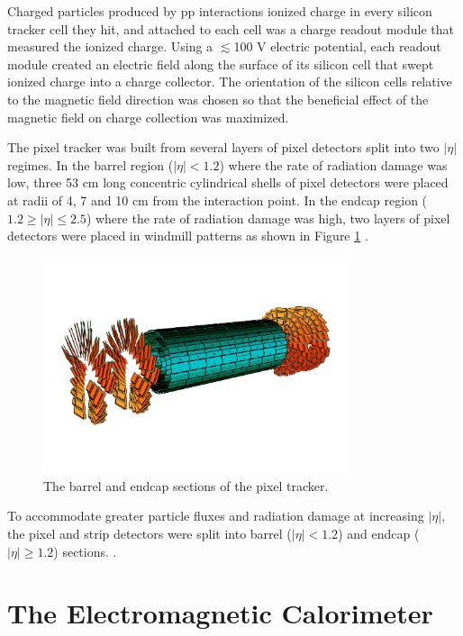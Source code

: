 Charged particles produced by pp interactions ionized charge in every silicon tracker cell they hit, and attached 
to each cell was a charge readout module that measured the ionized charge.  Using a $\lesssim$100 V electric 
potential, each readout module created an electric field along the surface of its silicon cell that swept ionized 
charge into a charge collector.  The orientation of the silicon cells relative to the magnetic field direction 
was chosen so that the beneficial effect of the magnetic field on charge collection was maximized.

The pixel tracker was built from several layers of pixel detectors split into two $|\eta|$ regimes.  In 
the barrel region ($|\eta| < 1.2$) where the rate of radiation damage was low, three 53 cm long concentric 
cylindrical shells of pixel detectors were placed at radii of 4, 7 and 10 cm from the interaction point.  
In the endcap region ($1.2 \geq |\eta| \leq 2.5$) where the rate of radiation damage was high, two layers 
of pixel detectors were placed in windmill patterns as shown in Figure \ref{fig:pixelTracker} \cite{pixelCommissioning}.

\begin{figure}[ht]
	\centering
	\includegraphics[width=0.8\textwidth]{figures/pixelDetectorSchematic.png}
	\caption{The barrel and endcap sections of the pixel tracker.}
	\label{fig:pixelTracker}
\end{figure}


To 
accommodate greater particle fluxes and radiation damage at increasing $|\eta|$, the pixel and strip 
detectors were split into barrel ($|\eta| < 1.2$) and endcap ($|\eta| \geq 1.2$) sections.  .


\section{The Electromagnetic Calorimeter}
\label{sec:ecalDescription}

